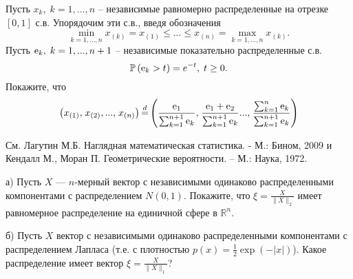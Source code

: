 \begin{problem} \label{paika} 
Пусть ${x}_{k} ,\; k=1,...,n$ -- независимые равномерно распределенные на отрезке $\left[0,1\right]$ с.в. Упорядочим эти с.в., введя обозначения
\[\mathop{\min }\limits_{k=1,...,n} {x}_{\left(k\right)} ={x}_{\left(1\right)} \le ...\le {x}_{\left(n\right)} =\mathop{\max }\limits_{k=1,...,n} {x}_{\left(k\right)} .\] 
Пусть ${\rm e}_{k} ,\; k=1,...,n+1$ -- независимые показательно распределенные с.в. 
\[\mathbb{P}\left({\rm e}_{k} >t\right)=e^{-t} ,\; t\ge 0.\] 
Покажите, что
\[\left({x}_{\left(1\right)} {\rm ,}\; {x}_{\left(2\right)} {\rm ,...,}\; {x}_{\left(n\right)} \right) \mathop{=}\limits^{d} \left(\frac{{\rm e}_{1} }{\sum _{k=1}^{n+1}{\rm e}_{k}  } {\rm ,}\; \frac{{\rm e}_{1} +{\rm e}_{2} }{\sum _{k=1}^{n+1}{\rm e}_{k}  } {\rm ...,}\; \frac{\sum _{k=1}^{n}{\rm e}_{k}  }{\sum _{k=1}^{n+1}{\rm e}_{k}  } \right) \] 
\end{problem}

\begin{remark}
См. Лагутин М.Б. Наглядная математическая статистика. - М.: Бином, 2009 и Кендалл М., Моран П. Геометрические вероятности. – М.: Наука, 1972.
\end{remark}

\begin{problem}

а) Пусть ${X}$ ---  $n$-мерный вектор с независимыми одинаково распределенными компонентами с распределением $N(0,1)$. Покажите, что ${\xi} = \frac{{X}}{\|{X}\|_2}$ имеет  равномерное распределение на единичной сфере в $\mathbb{R}^n$. 

б) Пусть ${X}$ вектор с независимыми одинаково распределенными компонентами с распределением Лапласа (т.е. с плотностью $p(x)=\frac{1}{2}\exp(-|x|)$). Какое распределение имеет вектор  ${\xi} = \frac{{X}}{\|{X}\|_1}$? 
\end{problem}




